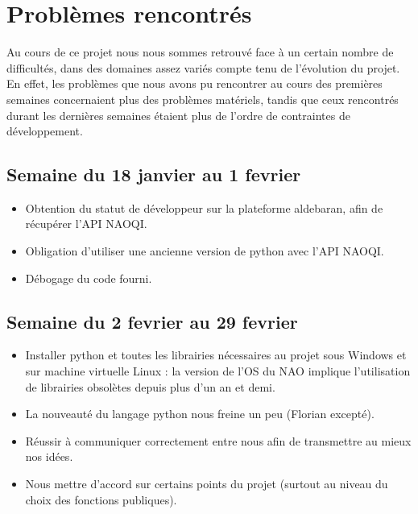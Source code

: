 \section{Problèmes rencontrés}
\label{sec:Problèmes rencontrés}

  \par Au cours de ce projet nous nous sommes retrouvé face à un certain nombre de difficultés, dans des domaines assez variés compte tenu de l'évolution du projet.
  En effet, les problèmes que nous avons pu rencontrer au cours des premières semaines concernaient plus des problèmes matériels,
  tandis que ceux rencontrés durant les dernières semaines étaient plus de l'ordre de contraintes de développement.\\

  \subsection{Semaine du 18 janvier au 1 fevrier}
    \label{sub:Semaine du 18 janvier au 1 fevrier}
    \begin{itemize}
      \item Obtention du statut de développeur sur la plateforme aldebaran, afin de récupérer l’API NAOQI.
      \item Obligation d’utiliser une ancienne version de python avec l’API NAOQI.
      \item Débogage du code fourni.\\
    \end{itemize}



  \subsection{Semaine du 2 fevrier au 29 fevrier}
  \label{sub:Semaine du 2 fevrier au 29 fevrier}
    \begin{itemize}
      \item Installer python et toutes les librairies nécessaires au projet sous Windows et sur machine virtuelle Linux : la version de l’OS du NAO implique l’utilisation de librairies obsolètes depuis plus d’un an et demi.
      \item La nouveauté du langage python nous freine un peu (Florian excepté).
      \item Réussir à communiquer correctement entre nous afin de transmettre au mieux nos idées.
      \item Nous mettre d’accord sur certains points du projet (surtout au niveau du choix des fonctions publiques).\\
    \end{itemize}



